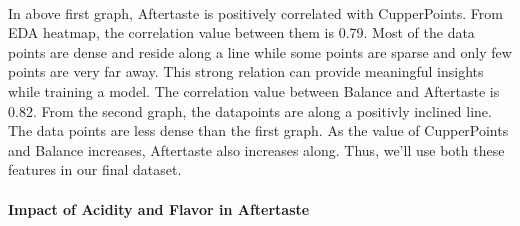 \documentclass[11pt]{article}
\begin{document}
    \begin{center}
    \end{center}
    { \hspace*{\fill} \\}
    
    In above first graph, Aftertaste is positively correlated with
CupperPoints. From EDA heatmap, the correlation value between them is
0.79. Most of the data points are dense and reside along a line while
some points are sparse and only few points are very far away. This
strong relation can provide meaningful insights while training a model.
The correlation value between Balance and Aftertaste is 0.82. From the
second graph, the datapoints are along a positivly inclined line. The
data points are less dense than the first graph. As the value of
CupperPoints and Balance increases, Aftertaste also increases along.
Thus, we'll use both these features in our final dataset.

    \hypertarget{impact-of-acidity-and-flavor-in-aftertaste}{%
\paragraph{Impact of Acidity and Flavor in
Aftertaste}\label{impact-of-acidity-and-flavor-in-aftertaste}}
\end{document}
